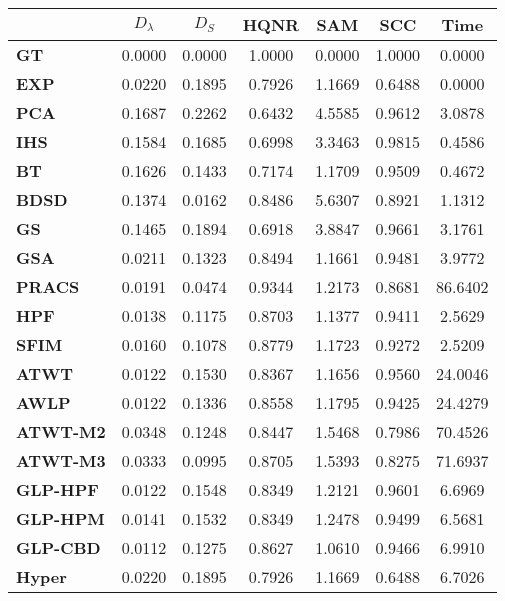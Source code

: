 \begin{tabular}{|l|c|c|c|c|c|c|}
\hline
&\textbf{$D_{\lambda}$}&\textbf{$D_{S}$}&\textbf{HQNR}&\textbf{SAM}&\textbf{SCC}&\textbf{Time}\\\hline
\textbf{GT}&0.0000&0.0000&1.0000&0.0000&1.0000&0.0000\\\hline
\textbf{EXP}&0.0220&0.1895&0.7926&1.1669&0.6488&0.0000\\\hline
\textbf{PCA}&0.1687&0.2262&0.6432&4.5585&0.9612&3.0878\\\hline
\textbf{IHS}&0.1584&0.1685&0.6998&3.3463&0.9815&0.4586\\\hline
\textbf{BT}&0.1626&0.1433&0.7174&1.1709&0.9509&0.4672\\\hline
\textbf{BDSD}&0.1374&0.0162&0.8486&5.6307&0.8921&1.1312\\\hline
\textbf{GS}&0.1465&0.1894&0.6918&3.8847&0.9661&3.1761\\\hline
\textbf{GSA}&0.0211&0.1323&0.8494&1.1661&0.9481&3.9772\\\hline
\textbf{PRACS}&0.0191&0.0474&0.9344&1.2173&0.8681&86.6402\\\hline
\textbf{HPF}&0.0138&0.1175&0.8703&1.1377&0.9411&2.5629\\\hline
\textbf{SFIM}&0.0160&0.1078&0.8779&1.1723&0.9272&2.5209\\\hline
\textbf{ATWT}&0.0122&0.1530&0.8367&1.1656&0.9560&24.0046\\\hline
\textbf{AWLP}&0.0122&0.1336&0.8558&1.1795&0.9425&24.4279\\\hline
\textbf{ATWT-M2}&0.0348&0.1248&0.8447&1.5468&0.7986&70.4526\\\hline
\textbf{ATWT-M3}&0.0333&0.0995&0.8705&1.5393&0.8275&71.6937\\\hline
\textbf{GLP-HPF}&0.0122&0.1548&0.8349&1.2121&0.9601&6.6969\\\hline
\textbf{GLP-HPM}&0.0141&0.1532&0.8349&1.2478&0.9499&6.5681\\\hline
\textbf{GLP-CBD}&0.0112&0.1275&0.8627&1.0610&0.9466&6.9910\\\hline
\textbf{Hyper}&0.0220&0.1895&0.7926&1.1669&0.6488&6.7026\\\hline
\end{tabular}
